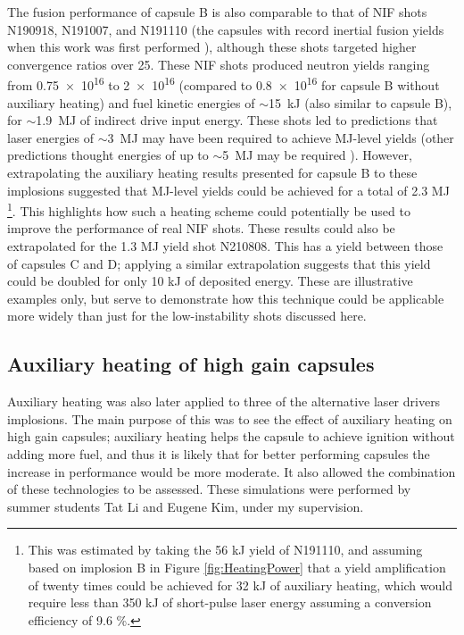 The fusion performance of capsule B is also comparable to that of NIF shots N190918, N191007, and N191110 (the capsules with record inertial fusion yields when this work was first performed \cite{Zylstra2021}), although these shots targeted higher convergence ratios over 25. These NIF shots produced neutron yields ranging from \num{0.75e16} to \num{2e16} (compared to \num{0.8e16} for capsule B without auxiliary heating) and fuel kinetic energies of $\sim$15~kJ (also similar to capsule B), for $\sim$1.9~MJ of indirect drive input energy. These shots led to predictions that laser energies of $\sim$3~MJ \cite{Zylstra2021} may have been required to achieve MJ-level yields (other predictions thought energies of up to $\sim$5~MJ may be required \cite{Zylstra2021, Cheng2021}). However, extrapolating the auxiliary heating results presented for capsule B to these implosions suggested that MJ-level yields could be achieved for a total of 2.3 MJ \footnote{This was estimated by taking the 56 kJ yield of N191110, and assuming based on implosion B in Figure \ref{fig:HeatingPower} that a yield amplification of twenty times could be achieved for 32 kJ of auxiliary heating, which would require less than 350 kJ of short-pulse laser energy assuming a conversion efficiency of 9.6 \%.}. This highlights how such a heating scheme could potentially be used to improve the performance of real NIF shots. These results could also be extrapolated for the 1.3 MJ yield shot N210808. This has a yield between those of capsules C and D; applying a similar extrapolation suggests that this yield could be doubled for only 10 kJ of deposited energy. These are illustrative examples only, but serve to demonstrate how this technique could be applicable more widely than just for the low-instability shots discussed here.

\subsection{Auxiliary heating of high gain capsules}
Auxiliary heating was also later applied to three of the alternative laser drivers implosions. The main purpose of this was to see the effect of auxiliary heating on high gain capsules; auxiliary heating helps the capsule to achieve ignition without adding more fuel, and thus it is likely that for better performing capsules the increase in performance would be more moderate. It also allowed the combination of these technologies to be assessed. These simulations were performed by summer students Tat Li and Eugene Kim, under my supervision.

